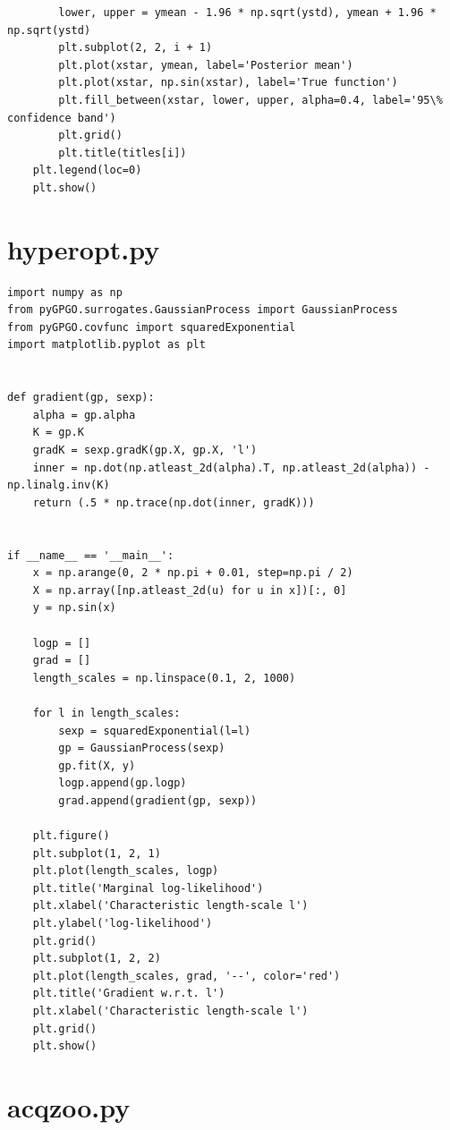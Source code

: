 \documentclass[10pt,a4paper,twoside]{book}
\begin{document}
\begin{appendices}
\begin{verbatim}
        lower, upper = ymean - 1.96 * np.sqrt(ystd), ymean + 1.96 * np.sqrt(ystd)
        plt.subplot(2, 2, i + 1)
        plt.plot(xstar, ymean, label='Posterior mean')
        plt.plot(xstar, np.sin(xstar), label='True function')
        plt.fill_between(xstar, lower, upper, alpha=0.4, label='95\% confidence band')
        plt.grid()
        plt.title(titles[i])
    plt.legend(loc=0)
    plt.show()

\end{verbatim}

\section{hyperopt.py}
\label{hyperopt}
\begin{verbatim}
import numpy as np
from pyGPGO.surrogates.GaussianProcess import GaussianProcess
from pyGPGO.covfunc import squaredExponential
import matplotlib.pyplot as plt


def gradient(gp, sexp):
    alpha = gp.alpha
    K = gp.K
    gradK = sexp.gradK(gp.X, gp.X, 'l')
    inner = np.dot(np.atleast_2d(alpha).T, np.atleast_2d(alpha)) - np.linalg.inv(K)
    return (.5 * np.trace(np.dot(inner, gradK)))


if __name__ == '__main__':
    x = np.arange(0, 2 * np.pi + 0.01, step=np.pi / 2)
    X = np.array([np.atleast_2d(u) for u in x])[:, 0]
    y = np.sin(x)

    logp = []
    grad = []
    length_scales = np.linspace(0.1, 2, 1000)

    for l in length_scales:
        sexp = squaredExponential(l=l)
        gp = GaussianProcess(sexp)
        gp.fit(X, y)
        logp.append(gp.logp)
        grad.append(gradient(gp, sexp))

    plt.figure()
    plt.subplot(1, 2, 1)
    plt.plot(length_scales, logp)
    plt.title('Marginal log-likelihood')
    plt.xlabel('Characteristic length-scale l')
    plt.ylabel('log-likelihood')
    plt.grid()
    plt.subplot(1, 2, 2)
    plt.plot(length_scales, grad, '--', color='red')
    plt.title('Gradient w.r.t. l')
    plt.xlabel('Characteristic length-scale l')
    plt.grid()
    plt.show()

\end{verbatim}

\section{acqzoo.py}



\end{appendices}
\end{document}
